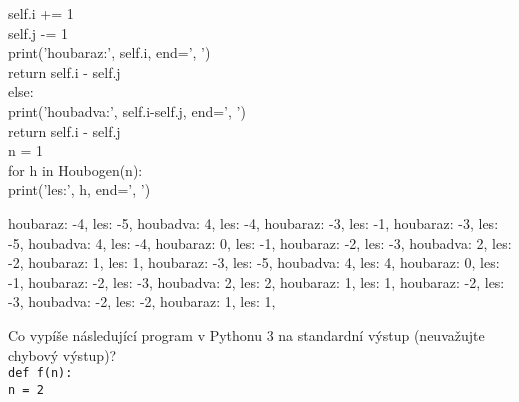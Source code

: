 \documentclass[addpoints,12pt]{exam}
\begin{document}
\begin{questions}
{\hspace*{0.6cm}\hspace*{0.6cm}\hspace*{0.6cm}self.i += 1\\
\hspace*{0.6cm}\hspace*{0.6cm}\hspace*{0.6cm}self.j -= 1\\
\hspace*{0.6cm}\hspace*{0.6cm}\hspace*{0.6cm}print('houbaraz:', self.i, end=', ')\\
\hspace*{0.6cm}\hspace*{0.6cm}\hspace*{0.6cm}return self.i - self.j\\
\hspace*{0.6cm}\hspace*{0.6cm}else:\\
\hspace*{0.6cm}\hspace*{0.6cm}\hspace*{0.6cm}print('houbadva:', self.i-self.j, end=', ')\\
\hspace*{0.6cm}\hspace*{0.6cm}\hspace*{0.6cm}return self.i - self.j\\
n = 1\\
for h in Houbogen(n):\\
\hspace*{0.6cm}print('les:', h, end=', ')}
\nopagebreak
\begin{choices}
\choice
houbaraz: -4, les: -5, houbadva: 4, les: -4, houbaraz: -3, les: -1,
\choice
houbaraz: -3, les: -5, houbadva: 4, les: -4, houbaraz: 0, les: -1,
\choice
houbaraz: -2, les: -3, houbadva: 2, les: -2, houbaraz: 1, les: 1,
\choice
houbaraz: -3, les: -5, houbadva: 4, les: 4, houbaraz: 0, les: -1,
\choice
houbaraz: -2, les: -3, houbadva: 2, les: 2, houbaraz: 1, les: 1,
\choice
houbaraz: -2, les: -3, houbadva: -2, les: -2, houbaraz: 1, les: 1,
\end{choices}
\question[2]
Co vypíše následující program v Pythonu 3 na standardní výstup (neuvažujte chybový výstup)?\\
\texttt{def f(n):\\
\hspace*{0.6cm}n = 2\\
}
\end{questions}
\end{document}
